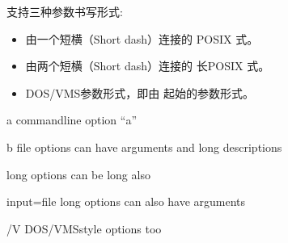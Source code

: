 \documentclass[a4paper,10pt,english]{sphinxmanual}
\begin{document}
\sphinxAtStartPar
支持三种参数书写形式:
\begin{itemize}
\item {} 
\sphinxAtStartPar
由一个短横（Short dash）连接的 POSIX 式。

\item {} 
\sphinxAtStartPar
由两个短横（Short dash）连接的 长POSIX 式。

\item {} 
\sphinxAtStartPar
DOS/VMS参数形式，即由 \sphinxtitleref{/} 起始的参数形式。

\end{itemize}

\sphinxAtStartPar
{}

\begin{sphinxVerbatim}[commandchars=\\\{\}]
              
           
                
            
      
              
\end{sphinxVerbatim}

\sphinxAtStartPar
{}
\begin{optionlist}{3cm}
\item [\sphinxhyphen{}a]  
\sphinxAtStartPar
command\sphinxhyphen{}line option “a”
\item [\sphinxhyphen{}b file]  
\sphinxAtStartPar
options can have arguments
and long descriptions
\item [\sphinxhyphen{}\sphinxhyphen{}long]  
\sphinxAtStartPar
options can be long also
\item [\sphinxhyphen{}\sphinxhyphen{}input=file]  
\sphinxAtStartPar
long options can also have
arguments
\item [/V]  
\sphinxAtStartPar
DOS/VMS\sphinxhyphen{}style options too
\end{optionlist}
\end{document}
